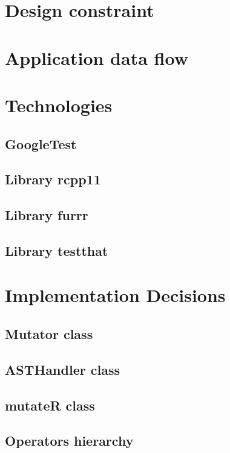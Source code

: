 \begin{chapterabstract}
\end{chapterabstract}

\section{Design constraint}

\section{Application data flow}


\section{Technologies}

\subsection{GoogleTest}

\subsection{Library rcpp11}

\subsection{Library furrr}

\subsection{Library testthat}

\section{Implementation Decisions}

\subsection{Mutator class}


\subsection{ASTHandler class}


\subsection{mutateR class}


\subsection{Operators hierarchy}

